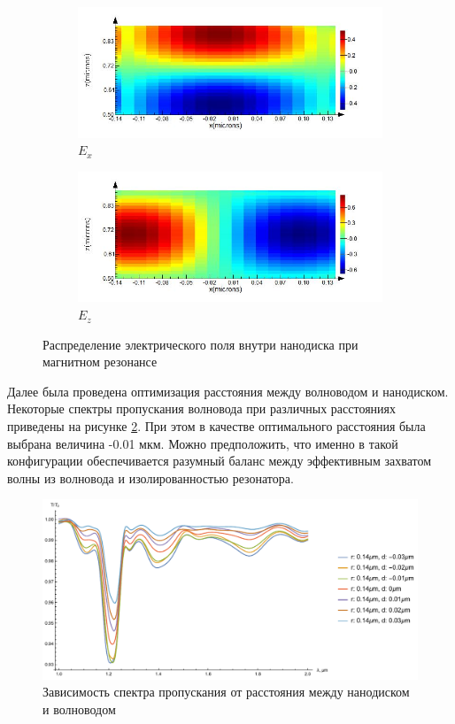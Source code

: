 \begin{figure}[H]
	\begin{subfigure}[b]{.5\textwidth}
		\includegraphics[width=\textwidth]{img/E_x_014}
		\caption{$E_x$}
	\end{subfigure}
	\begin{subfigure}[b]{.5\textwidth}
		\includegraphics[width=\textwidth]{img/E_z_014}
		\caption{$E_z$}
	\end{subfigure}
	\caption{Распределение электрического поля внутри нанодиска при магнитном резонансе}
	\label{fig:E_reson}
\end{figure}

Далее была проведена оптимизация расстояния между волноводом и нанодиском. Некоторые спектры пропускания волновода при различных расстояниях приведены на рисунке \ref{fig:1x_fixed_r}. При этом в качестве оптимального расстояния была выбрана величина -0.01 мкм. Можно предположить, что именно в такой конфигурации обеспечивается разумный баланс между эффективным захватом волны из волновода и изолированностью резонатора.

\begin{figure}[h]
	\centering
	\includegraphics[width=.9\textwidth]{img/r_014_d_var}
	\caption{Зависимость спектра пропускания от расстояния между нанодиском и волноводом}
	\label{fig:1x_fixed_r}
\end{figure}

